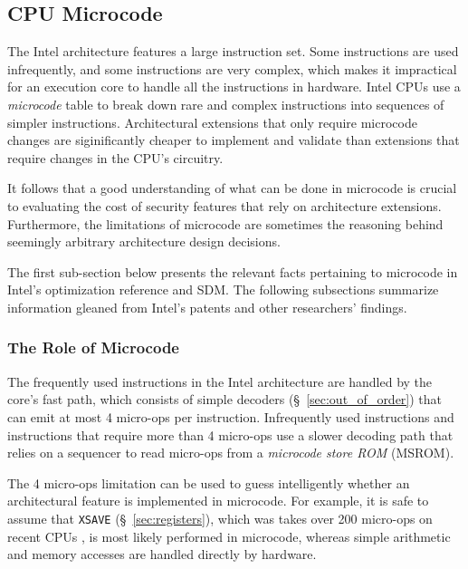 \subsection{CPU Microcode}
\label{sec:microcode}


The Intel architecture features a large instruction set. Some instructions are
used infrequently, and some instructions are very complex, which makes it
impractical for an execution core to handle all the instructions in hardware.
Intel CPUs use a \textit{microcode} table to break down rare and complex
instructions into sequences of simpler instructions. Architectural extensions
that only require microcode changes are siginificantly cheaper to implement
and validate than extensions that require changes in the CPU's circuitry.

It follows that a good understanding of what can be done in microcode is
crucial to evaluating the cost of security features that rely on architecture
extensions. Furthermore, the limitations of microcode are sometimes the
reasoning behind seemingly arbitrary architecture design decisions.

The first sub-section below presents the relevant facts pertaining to microcode
in Intel's optimization reference \cite{intel2014optimization} and SDM. The
following subsections summarize information gleaned from Intel's patents and
other researchers' findings.


\subsubsection{The Role of Microcode}
\label{sec:microcode_role}


The frequently used instructions in the Intel architecture are handled by the
core's fast path, which consists of simple decoders (\S~\ref{sec:out_of_order})
that can emit at most 4 micro-ops per instruction. Infrequently used
instructions and instructions that require more than 4 micro-ops use a slower
decoding path that relies on a sequencer to read micro-ops from a
\textit{microcode store ROM} (MSROM).

The 4 micro-ops limitation can be used to guess intelligently whether an
architectural feature is implemented in microcode. For example, it is safe to
assume that \texttt{XSAVE} (\S~\ref{sec:registers}), which was takes over 200
micro-ops on recent CPUs \cite{fog2014microops}, is most likely performed in
microcode, whereas simple arithmetic and memory accesses are handled directly
by hardware.

